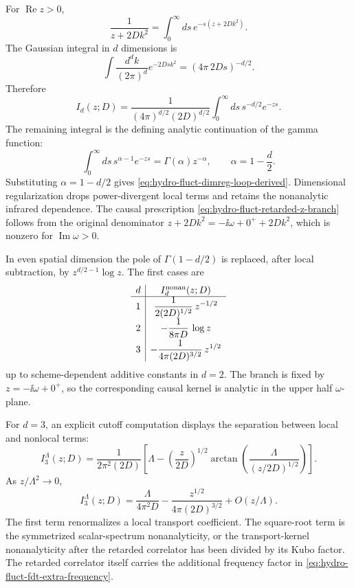 For \(\operatorname{Re}z>0\),
\begin{equation}
  \frac{1}{z+2Dk^2}
  =
  \int_0^\infty ds\,e^{-s(z+2Dk^2)} .
  \label{eq:hydro-fluct-schwinger-representation}
\end{equation}
The Gaussian integral in \(d\) dimensions is
\begin{equation}
  \int\frac{d^dk}{(2\pi)^d}e^{-2Dsk^2}
  =
  (4\pi\,2Ds)^{-d/2}.
  \label{eq:hydro-fluct-gaussian-d-dimensional}
\end{equation}
Therefore
\begin{equation}
  I_d(z;D)
  =
  \frac{1}{(4\pi)^{d/2}(2D)^{d/2}}
  \int_0^\infty ds\,s^{-d/2}e^{-zs}.
  \label{eq:hydro-fluct-schwinger-after-gaussian}
\end{equation}
The remaining integral is the defining analytic continuation of the gamma
function:
\begin{equation}
  \int_0^\infty ds\,s^{\alpha-1}e^{-zs}
  =
  \Gamma(\alpha)z^{-\alpha},
  \qquad \alpha=1-\frac d2 .
  \label{eq:hydro-fluct-gamma-integral}
\end{equation}
Substituting \(\alpha=1-d/2\) gives
\eqref{eq:hydro-fluct-dimreg-loop-derived}.  Dimensional regularization
drops power-divergent local terms and retains the nonanalytic infrared
dependence.  The causal prescription
\eqref{eq:hydro-fluct-retarded-z-branch} follows from the original
denominator \(z+2Dk^2=-\ii\omega+0^+ +2Dk^2\), which is nonzero for
\(\operatorname{Im}\omega>0\).

In even spatial dimension the pole of \(\Gamma(1-d/2)\) is replaced, after
local subtraction, by \(z^{d/2-1}\log z\).  The first cases are
\[
\begin{array}{c|c}
d & I_d^{\rm nonan}(z;D)\\ \hline
1 & \displaystyle \frac{1}{2(2D)^{1/2}}\,z^{-1/2}\\[2mm]
2 & \displaystyle -\frac{1}{8\pi D}\,\log z\\[2mm]
3 & \displaystyle -\frac{1}{4\pi(2D)^{3/2}}\,z^{1/2}
\end{array}
\]
up to scheme-dependent additive constants in \(d=2\).  The branch is fixed
by \(z=-\ii\omega+0^+\), so the corresponding causal kernel is analytic in
the upper half \(\omega\)-plane.

For \(d=3\), an explicit cutoff computation displays the separation between
local and nonlocal terms:
\[
  I_3^\Lambda(z;D)
  =
  \frac{1}{2\pi^2(2D)}
  \left[
    \Lambda
    -
    \left(\frac{z}{2D}\right)^{1/2}
    \arctan\!\left(
      \frac{\Lambda}{(z/2D)^{1/2}}
    \right)
  \right].
\]
As \(z/\Lambda^2\to0\),
\[
  I_3^\Lambda(z;D)
  =
  \frac{\Lambda}{4\pi^2D}
  -
  \frac{z^{1/2}}{4\pi(2D)^{3/2}}
  +O(z/\Lambda).
\]
The first term renormalizes a local transport coefficient.  The square-root
term is the symmetrized scalar-spectrum nonanalyticity, or the transport-kernel
nonanalyticity after the retarded correlator has been divided by its Kubo
factor.  The retarded correlator itself carries the additional frequency
factor in \eqref{eq:hydro-fluct-fdt-extra-frequency}.

